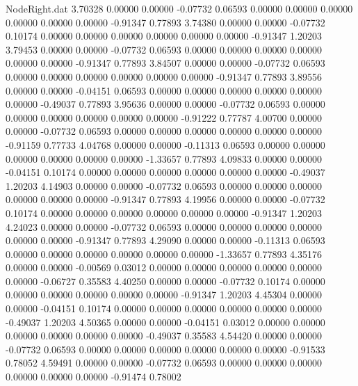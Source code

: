 \begin{filecontents}{NodeRight.dat}
   3.70328    0.00000    0.00000    -0.07732    0.06593    0.00000    0.00000    0.00000    0.00000    0.00000    0.00000   -0.91347    0.77893
   3.74380    0.00000    0.00000    -0.07732    0.10174    0.00000    0.00000    0.00000    0.00000    0.00000    0.00000   -0.91347    1.20203
   3.79453    0.00000    0.00000    -0.07732    0.06593    0.00000    0.00000    0.00000    0.00000    0.00000    0.00000   -0.91347    0.77893
   3.84507    0.00000    0.00000    -0.07732    0.06593    0.00000    0.00000    0.00000    0.00000    0.00000    0.00000   -0.91347    0.77893
   3.89556    0.00000    0.00000    -0.04151    0.06593    0.00000    0.00000    0.00000    0.00000    0.00000    0.00000   -0.49037    0.77893
   3.95636    0.00000    0.00000    -0.07732    0.06593    0.00000    0.00000    0.00000    0.00000    0.00000    0.00000   -0.91222    0.77787
   4.00700    0.00000    0.00000    -0.07732    0.06593    0.00000    0.00000    0.00000    0.00000    0.00000    0.00000   -0.91159    0.77733
   4.04768    0.00000    0.00000    -0.11313    0.06593    0.00000    0.00000    0.00000    0.00000    0.00000    0.00000   -1.33657    0.77893
   4.09833    0.00000    0.00000    -0.04151    0.10174    0.00000    0.00000    0.00000    0.00000    0.00000    0.00000   -0.49037    1.20203
   4.14903    0.00000    0.00000    -0.07732    0.06593    0.00000    0.00000    0.00000    0.00000    0.00000    0.00000   -0.91347    0.77893
   4.19956    0.00000    0.00000    -0.07732    0.10174    0.00000    0.00000    0.00000    0.00000    0.00000    0.00000   -0.91347    1.20203
   4.24023    0.00000    0.00000    -0.07732    0.06593    0.00000    0.00000    0.00000    0.00000    0.00000    0.00000   -0.91347    0.77893
   4.29090    0.00000    0.00000    -0.11313    0.06593    0.00000    0.00000    0.00000    0.00000    0.00000    0.00000   -1.33657    0.77893
   4.35176    0.00000    0.00000    -0.00569    0.03012    0.00000    0.00000    0.00000    0.00000    0.00000    0.00000   -0.06727    0.35583
   4.40250    0.00000    0.00000    -0.07732    0.10174    0.00000    0.00000    0.00000    0.00000    0.00000    0.00000   -0.91347    1.20203
   4.45304    0.00000    0.00000    -0.04151    0.10174    0.00000    0.00000    0.00000    0.00000    0.00000    0.00000   -0.49037    1.20203
   4.50365    0.00000    0.00000    -0.04151    0.03012    0.00000    0.00000    0.00000    0.00000    0.00000    0.00000   -0.49037    0.35583
   4.54420    0.00000    0.00000    -0.07732    0.06593    0.00000    0.00000    0.00000    0.00000    0.00000    0.00000   -0.91533    0.78052
   4.59491    0.00000    0.00000    -0.07732    0.06593    0.00000    0.00000    0.00000    0.00000    0.00000    0.00000   -0.91474    0.78002

\end{filecontents}
